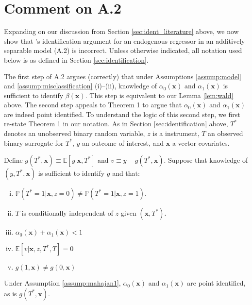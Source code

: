 \section{Comment on \cite{Mahajan} A.2}
\label{sec:mahajan}
Expanding on our discussion from Section \ref{sec:ident_literature} above, we now show that \citeauthor{Mahajan}'s identification argument for an endogenous regressor in an additively separable model (A.2) is incorrect.
Unless otherwise indicated, all notation used below is as defined in Section \ref{sec:identification}.

The first step of \cite{Mahajan} A.2 argues (correctly) that under Assumptions \ref{assump:model} and \ref{assump:misclassification} (i)--(ii), knowledge of $\alpha_0(\mathbf{x})$ and $\alpha_1(\mathbf{x})$ is sufficient to identify $\beta(\mathbf{x})$. 
This step is equivalent to our Lemma \ref{lem:wald} above.
The second step appeals to \cite{Mahajan} Theorem 1 to argue that $\alpha_0(\mathbf{x})$ and $\alpha_1(\mathbf{x})$ are indeed point identified.
To understand the logic of this second step, we first re-state \cite{Mahajan} Theorem 1 in our notation.
As in Section \ref{sec:identification} above, $T^*$ denotes an unobserved binary random variable, $z$ is a instrument, $T$ an observed binary surrogate for $T^*$, $y$ an outcome of interest, and $\mathbf{x}$ a vector covariates.

\begin{assump}
  Define $g(T^*, \mathbf{x}) \equiv \mathbb{E}[y|\mathbf{x},T^*]$ and $v \equiv y - g(T^*,\mathbf{x})$.
  Suppose that knowledge of $(y,T^*,\mathbf{x})$ is sufficient to identify $g$ and that:
  \begin{enumerate}[(i)]
    \item $\mathbb{P}(T^*=1|\mathbf{x},z=0) \neq \mathbb{P}(T^*=1|\mathbf{x},z=1)$.
    \item $T$ is conditionally independent of $z$ given $(\mathbf{x}, T^*)$.
    \item $\alpha_0(\mathbf{x}) + \alpha_1(\mathbf{x}) < 1$
    \item $\mathbb{E}[v|\mathbf{x},z,T^*,T] = 0$
    \item $g(1,\mathbf{x}) \neq g(0, \mathbf{x})$
  \end{enumerate}
  \label{assump:mahajan1}
\end{assump}

\begin{thm}
  Under Assumption \ref{assump:mahajan1}, $\alpha_0(\mathbf{x})$ and $\alpha_1(\mathbf{x})$ are point identified, as is $g(T^*,\mathbf{x})$.
  \label{thm:mahajan1}
\end{thm}

